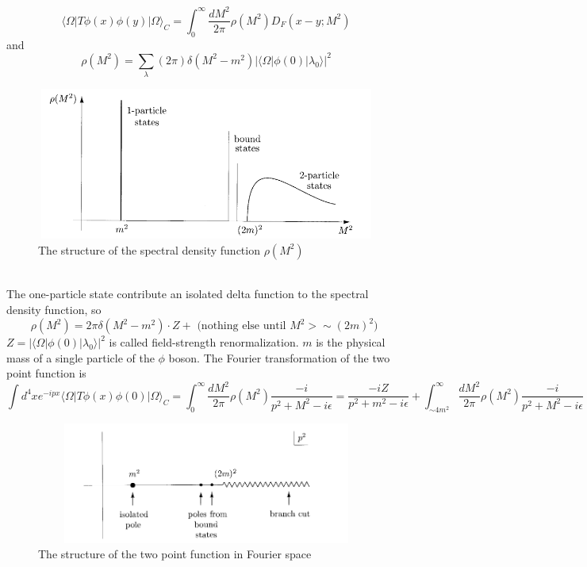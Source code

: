 \documentclass{article}
\begin{document}
\[\langle \Omega | T \phi(x) \phi(y) | \Omega \rangle_C = \int_0^{\infty} \frac{dM^2}{2\pi} \rho(M^2) D_F(x-y;M^2)\]
and 
\[\rho(M^2) = \sum_{\lambda} (2\pi) \delta(M^2-m^2)|\langle \Omega | \phi(0) | \lambda_0 \rangle|^2 \]
\begin{figure}[!h]
\centering
\includegraphics[height=5cm ,width=12cm]{./pic/FSR2.png}
\caption*{The structure of the spectral density function $\rho(M^2)$}
\end{figure}\\
The one-particle state contribute an isolated delta function to the spectral density function, so
\[\rho(M^2) = 2\pi \delta (M^2 -m^2) \cdot Z + \mbox{ (nothing else until $M^2 > \sim (2m)^2$) }\]
$Z = |\langle \Omega | \phi(0) | \lambda_0 \rangle|^2$ is called field-strength renormalization. $m$ is the physical mass of a single particle of the $\phi$ boson. The Fourier transformation of the two point function is
\[\int d^4x e^{-ipx} \langle \Omega | T \phi(x) \phi(0) | \Omega \rangle_C  = \int_{0}^{\infty} \frac{dM^2}{2\pi} \rho(M^2) \frac{-i}{p^2+M^2-i\epsilon} = \frac{-iZ}{p^2+m^2-i\epsilon} +  \int_{\sim 4m^2}^{\infty} \frac{dM^2}{2\pi} \rho(M^2) \frac{-i}{p^2+M^2-i\epsilon}\]
\begin{figure}[!h]
\centering
\includegraphics[height=4cm ,width=12cm]{./pic/FSR3.png}
\caption*{The structure of the two point function in Fourier space}
\end{figure}\\
\end{document}
